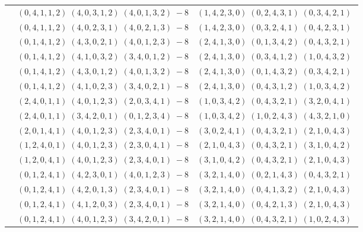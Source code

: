 \documentclass[11pt]{article}
\begin{document}
\begin{longtable}[l]{|c|c|c|}
 \cline{2-3} 
 & $(0 ,4 ,1 ,1 ,2) \;(4 ,0 ,3 ,1 ,2) \;(4 ,0 ,1 ,3 ,2) \;-8$ & $(1 ,4 ,2 ,3 ,0) \;(0 ,2 ,4 ,3 ,1) \;(0 ,3 ,4 ,2 ,1) \;$\\ 
 \cline{2-3} 
 & $(0 ,4 ,1 ,1 ,2) \;(4 ,0 ,2 ,3 ,1) \;(4 ,0 ,2 ,1 ,3) \;-8$ & $(1 ,4 ,2 ,3 ,0) \;(0 ,3 ,2 ,4 ,1) \;(0 ,4 ,2 ,3 ,1) \;$\\ 
 \cline{2-3} 
 & $(0 ,1 ,4 ,1 ,2) \;(4 ,3 ,0 ,2 ,1) \;(4 ,0 ,1 ,2 ,3) \;-8$ & $(2 ,4 ,1 ,3 ,0) \;(0 ,1 ,3 ,4 ,2) \;(0 ,4 ,3 ,2 ,1) \;$\\ 
 \cline{2-3} 
 & $(0 ,1 ,4 ,1 ,2) \;(4 ,1 ,0 ,3 ,2) \;(3 ,4 ,0 ,1 ,2) \;-8$ & $(2 ,4 ,1 ,3 ,0) \;(0 ,3 ,4 ,1 ,2) \;(1 ,0 ,4 ,3 ,2) \;$\\ 
 \cline{2-3} 
 & $(0 ,1 ,4 ,1 ,2) \;(4 ,3 ,0 ,1 ,2) \;(4 ,0 ,1 ,3 ,2) \;-8$ & $(2 ,4 ,1 ,3 ,0) \;(0 ,1 ,4 ,3 ,2) \;(0 ,3 ,4 ,2 ,1) \;$\\ 
 \cline{2-3} 
 & $(0 ,1 ,4 ,1 ,2) \;(4 ,1 ,0 ,2 ,3) \;(3 ,4 ,0 ,2 ,1) \;-8$ & $(2 ,4 ,1 ,3 ,0) \;(0 ,4 ,3 ,1 ,2) \;(1 ,0 ,3 ,4 ,2) \;$\\ 
 \cline{2-3} 
 & $(2 ,4 ,0 ,1 ,1) \;(4 ,0 ,1 ,2 ,3) \;(2 ,0 ,3 ,4 ,1) \;-8$ & $(1 ,0 ,3 ,4 ,2) \;(0 ,4 ,3 ,2 ,1) \;(3 ,2 ,0 ,4 ,1) \;$\\ 
 \cline{2-3} 
 & $(2 ,4 ,0 ,1 ,1) \;(3 ,4 ,2 ,0 ,1) \;(0 ,1 ,2 ,3 ,4) \;-8$ & $(1 ,0 ,3 ,4 ,2) \;(1 ,0 ,2 ,4 ,3) \;(4 ,3 ,2 ,1 ,0) \;$\\ 
 \cline{2-3} 
 & $(2 ,0 ,1 ,4 ,1) \;(4 ,0 ,1 ,2 ,3) \;(2 ,3 ,4 ,0 ,1) \;-8$ & $(3 ,0 ,2 ,4 ,1) \;(0 ,4 ,3 ,2 ,1) \;(2 ,1 ,0 ,4 ,3) \;$\\ 
 \cline{2-3} 
 & $(1 ,2 ,4 ,0 ,1) \;(4 ,0 ,1 ,2 ,3) \;(2 ,3 ,0 ,4 ,1) \;-8$ & $(2 ,1 ,0 ,4 ,3) \;(0 ,4 ,3 ,2 ,1) \;(3 ,1 ,0 ,4 ,2) \;$\\ 
 \cline{2-3} 
 & $(1 ,2 ,0 ,4 ,1) \;(4 ,0 ,1 ,2 ,3) \;(2 ,3 ,4 ,0 ,1) \;-8$ & $(3 ,1 ,0 ,4 ,2) \;(0 ,4 ,3 ,2 ,1) \;(2 ,1 ,0 ,4 ,3) \;$\\ 
 \cline{2-3} 
 & $(0 ,1 ,2 ,4 ,1) \;(4 ,2 ,3 ,0 ,1) \;(4 ,0 ,1 ,2 ,3) \;-8$ & $(3 ,2 ,1 ,4 ,0) \;(0 ,2 ,1 ,4 ,3) \;(0 ,4 ,3 ,2 ,1) \;$\\ 
 \cline{2-3} 
 & $(0 ,1 ,2 ,4 ,1) \;(4 ,2 ,0 ,1 ,3) \;(2 ,3 ,4 ,0 ,1) \;-8$ & $(3 ,2 ,1 ,4 ,0) \;(0 ,4 ,1 ,3 ,2) \;(2 ,1 ,0 ,4 ,3) \;$\\ 
 \cline{2-3} 
 & $(0 ,1 ,2 ,4 ,1) \;(4 ,1 ,2 ,0 ,3) \;(2 ,3 ,4 ,0 ,1) \;-8$ & $(3 ,2 ,1 ,4 ,0) \;(0 ,4 ,2 ,1 ,3) \;(2 ,1 ,0 ,4 ,3) \;$\\ 
 \cline{2-3} 
 & $(0 ,1 ,2 ,4 ,1) \;(4 ,0 ,1 ,2 ,3) \;(3 ,4 ,2 ,0 ,1) \;-8$ & $(3 ,2 ,1 ,4 ,0) \;(0 ,4 ,3 ,2 ,1) \;(1 ,0 ,2 ,4 ,3) \;$\\ 

\end{longtable}
\end{document}

